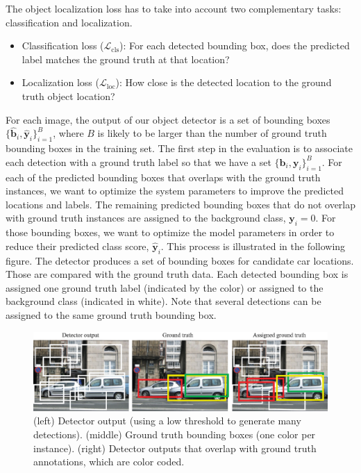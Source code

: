 The object localization loss has to take into account two complementary tasks: classification and localization.
\begin{itemize}
\item Classification loss ($\mathcal{L}_{\text{cls}}$): For each detected bounding box, does the predicted label matches the ground truth at that location? 
\item Localization loss ($\mathcal{L}_{\text{loc}}$): How close is the detected location to the ground truth object location?
\end{itemize}

For each image, the output of our object detector is a set of bounding boxes $\{\hat{\mathbf{b}}_i, \hat{\mathbf{y}}_i\}_{i=1}^B$, where $B$ is likely to be larger than the number of ground truth bounding boxes in the training set. The first step in the evaluation is to associate each detection with a ground truth label so that we have a set $\{\mathbf{b}_i, \mathbf{y}_i\}_{i=1}^B$. For each of the predicted bounding boxes that overlaps with the ground truth instances, we want to optimize the system parameters to improve the predicted locations and labels. The remaining predicted bounding boxes that do not overlap with ground truth instances are assigned to the background class, $\mathbf{y}_i=0$. For those bounding boxes, we want to optimize the model parameters in order to reduce their predicted class score, $\hat{\mathbf{y}}_i$. This process is illustrated in the following figure. The detector produces a set of bounding boxes for candidate car locations. Those are compared with the ground truth data. Each detected bounding box is assigned one ground truth label (indicated by the color) or assigned to the background class (indicated in white). Note that several detections can be assigned to the same ground truth bounding box. 

\begin{figure}
\centerline{
\includegraphics[width=1\linewidth]{figures/object_recognition/detections.eps}
}
\caption{%
(left) Detector output (using a low threshold to generate many detections). (middle) Ground truth bounding boxes (one color per instance). (right) Detector outputs that overlap with ground truth annotations, which are color coded.}
\end{figure}

